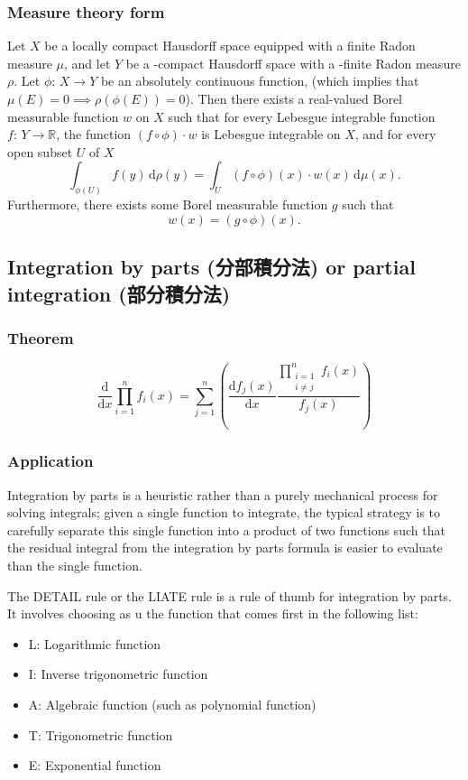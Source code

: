 \documentclass[a4paper,12pt]{report}
\begin{document}
\subsubsection{Measure theory form}
Let $X$ be a locally compact Hausdorff space equipped with a finite Radon measure $μ$, and let $Y$ be a \text{\textsigma}-compact Hausdorff space with a \text{\textsigma}-finite Radon measure $\rho$. Let $\phi:\,X\to Y$ be an absolutely continuous function, (which implies that $\mu(E)=0\implies\rho(\phi(E))=0$). Then there exists a real-valued Borel measurable function $w$ on $X$ such that for every Lebesgue integrable function $f:\,Y\to\mathbb{R}$, the function $(f\circ\phi)\cdot w$ is Lebesgue integrable on $X$, and for every open subset $U$ of $X$
\[\int_{\phi(U)}f(y)\,\mathrm{d}\rho(y)=\int_U(f\circ\phi)(x)\cdot w(x)\,\mathrm{d}\mu(x).\]
Furthermore, there exists some Borel measurable function $g$ such that 
\[w(x)=(g\circ\phi)(x).\]
\subsection{Integration by parts (分部積分法) or partial integration (部分積分法)}
\subsubsection{Theorem}
\[\frac{\mathrm{d}}{\mathrm{d}x}\prod_{i=1}^nf_i(x)=\sum_{j=1}^n\left(\frac{\mathrm{d}f_j(x)}{\mathrm{d}x}\frac{\prod_{\substack{i=1\\i\neq j}}^n f_i(x)}{f_j(x)}\right)\]
\subsubsection{Application}
Integration by parts is a heuristic rather than a purely mechanical process for solving integrals; given a single function to integrate, the typical strategy is to carefully separate this single function into a product of two functions such that the residual integral from the integration by parts formula is easier to evaluate than the single function.

The DETAIL rule or the LIATE rule is a rule of thumb for integration by parts. It involves choosing as u the function that comes first in the following list:
\begin{itemize}
\item L: Logarithmic function
\item I: Inverse trigonometric function
\item A: Algebraic function (such as polynomial function)
\item T: Trigonometric function
\item E: Exponential function
\end{itemize}
\end{document}
